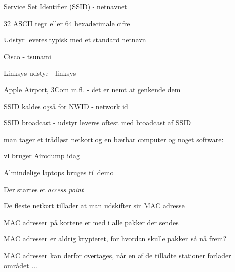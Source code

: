 \documentclass[20pt,landscape,a4paper,footrule]{foils}
\begin{document}

\begin{list1}
\item Service Set Identifier (SSID) - netnavnet
\item 32 ASCII tegn eller 64 hexadecimale cifre
\item Udstyr leveres typisk med et standard netnavn
\begin{list2}
\item Cisco - tsunami
\item Linksys udstyr - linksys
\item Apple Airport, 3Com m.fl. - det er nemt at genkende dem
\end{list2}
\item SSID kaldes også for NWID - network id
\item SSID broadcast - udstyr leveres oftest med broadcast af SSID
\end{list1}




\begin{list1}
\item man tager et trådløst netkort og en bærbar computer og noget software:
\begin{list2}
\item vi bruger Airodump idag
  \end{list2}
\end{list1}



\begin{list2}
\item Almindelige laptops bruges til demo
\item Der startes et \emph{access point}
\end{list2}


\begin{list1}
\item De fleste netkort tillader at man udskifter sin MAC adresse
\item MAC adressen på kortene er med i alle pakker der sendes
\item MAC adressen er aldrig krypteret, for hvordan skulle pakken så
  nå frem?
\item MAC adressen kan derfor overtages, når en af de tilladte
  stationer forlader området ...
\end{list1}
\end{document}
